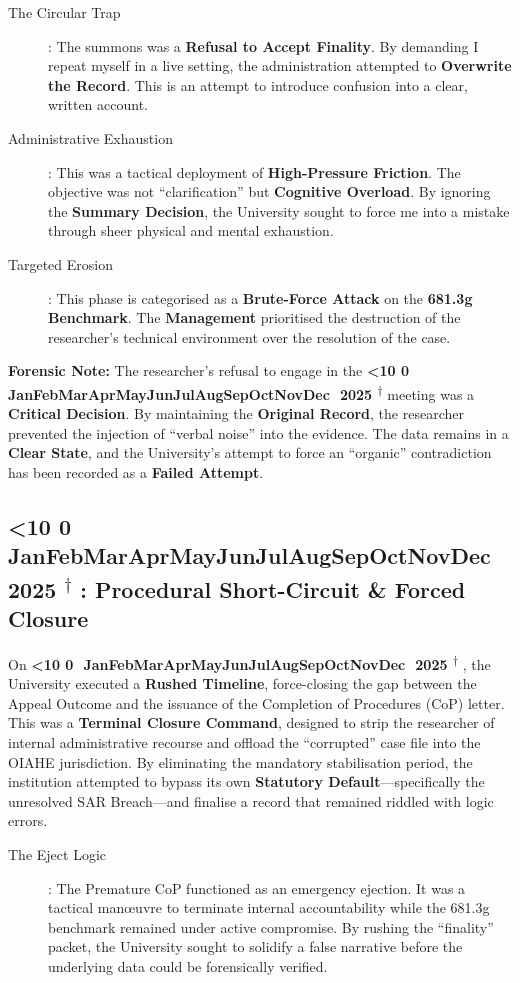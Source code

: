 \documentclass{EMBASSY}
\DeclareRobustCommand{\gmt}[3]{%
    \texorpdfstring{%
        {\color{DateGold}\textbf{%
            \ifnum#1<10 0\fi#1\,\textperiodcentered\,%
            \ifcase#2\or Jan\or Feb\or Mar\or Apr\or May\or Jun\or Jul\or Aug\or Sep\or Oct\or Nov\or Dec\fi
            \,\textperiodcentered\,20#3%
            \textsuperscript{$\dagger$}%
        }}%
    }{%
        (#1/#2/#3)%
    }%
}
\begin{document}
\begin{description}
    \item[The Circular Trap]: The summons was a \textbf{Refusal to Accept Finality}. By demanding I repeat myself in a live setting, the administration attempted to \textbf{Overwrite the Record}. This is an attempt to introduce confusion into a clear, written account.
    \item[Administrative Exhaustion]: This was a tactical deployment of \textbf{High-Pressure Friction}. The objective was not ``clarification'' but \textbf{Cognitive Overload}. By ignoring the \textbf{Summary Decision}, the University sought to force me into a mistake through sheer physical and mental exhaustion.
    \item[Targeted Erosion]: This phase is categorised as a \textbf{Brute-Force Attack} on the \textbf{681.3g Benchmark}. The \textbf{Management} prioritised the destruction of the researcher’s technical environment over the resolution of the case.
\end{description}

\noindent\textbf{Forensic Note:} The researcher's refusal to engage in the \gmt{15}{12}{25} meeting was a \textbf{Critical Decision}. By maintaining the \textbf{Original Record}, the researcher prevented the injection of ``verbal noise'' into the evidence. The data remains in a \textbf{Clear State}, and the University’s attempt to force an ``organic'' contradiction has been recorded as a \textbf{Failed Attempt}.

\subsection{\gmt{18}{12}{25}: Procedural Short-Circuit \& Forced Closure}
On \gmt{18}{12}{25}, the University executed a \textbf{Rushed Timeline}, force-closing the gap between the Appeal Outcome and the issuance of the Completion of Procedures (CoP) letter. This was a \textbf{Terminal Closure Command}, designed to strip the researcher of internal administrative recourse and offload the ``corrupted'' case file into the OIAHE jurisdiction. By eliminating the mandatory stabilisation period, the institution attempted to bypass its own \textbf{Statutory Default}---specifically the unresolved SAR Breach---and finalise a record that remained riddled with logic errors.

\begin{description}
    \item[The Eject Logic]: The Premature CoP functioned as an emergency ejection. It was a tactical man\oe uvre to terminate internal accountability while the 681.3g benchmark remained under active compromise. By rushing the ``finality'' packet, the University sought to solidify a false narrative before the underlying data could be forensically verified.
\end{description}
\end{document}
